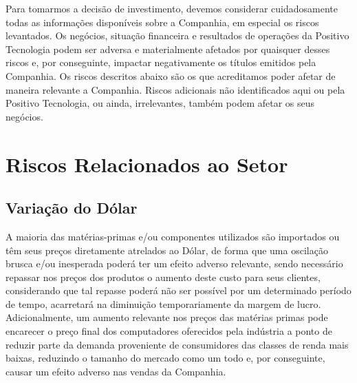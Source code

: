 Para tomarmos a decisão de investimento, devemos considerar cuidadosamente todas as informações disponíveis sobre a Companhia, em especial os riscos levantados.
Os negócios, situação financeira e resultados de operações da Positivo Tecnologia podem ser adversa e materialmente afetados por quaisquer desses riscos e, por conseguinte, impactar negativamente os títulos emitidos pela Companhia.
Os riscos descritos abaixo são os que acreditamos poder afetar de maneira relevante a Companhia.
Riscos adicionais não identificados aqui ou pela Positivo Tecnologia, ou ainda, irrelevantes, também podem afetar os seus negócios.

\section{Riscos Relacionados ao Setor}

\subsection{Variação do Dólar} A maioria das matérias-primas e/ou componentes utilizados são importados ou têm seus preços diretamente atrelados ao Dólar, de forma que uma oscilação brusca e/ou inesperada poderá ter um efeito adverso relevante, sendo necessário repassar nos preços dos produtos o aumento deste custo para seus clientes, considerando que tal repasse poderá não ser possível por um determinado período de tempo, acarretará na diminuição temporariamente da margem de lucro.
Adicionalmente, um aumento relevante nos preços das matérias primas pode encarecer o preço final dos computadores oferecidos pela indústria a ponto de reduzir parte da demanda proveniente de consumidores das classes de renda mais baixas, reduzindo o tamanho do mercado como um todo e, por conseguinte, causar um efeito adverso nas vendas da Companhia.

